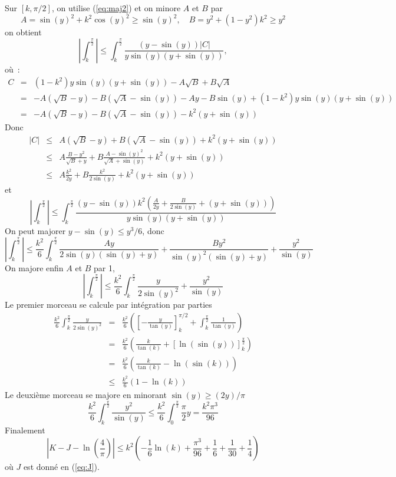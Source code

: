 \documentclass[a4paper,11pt]{article}
\begin{document}
Sur $[k,\pi/2]$, on utilise (\ref{eq:maj2})
et on minore $A$ et $B$ par
\[ A=\sin(y)^2+k^2 \cos(y)^2 \geq \sin(y)^2, \quad B=y^2+(1-y^2)k^2 \geq y^2\]
on obtient
\[ 
| \int_k^{\frac{\pi}{2}} | \leq  \int_k^{\frac{\pi}{2}}
\frac{(y-\sin(y))|C|}
{y \sin(y) (y+\sin(y))} , 
\]
où~:
\begin{eqnarray*}
C&=&(1-k^2)y \sin(y)(y+\sin(y))-A\sqrt{B}+B\sqrt{A} \\
&=& -A(\sqrt{B}-y)-B(\sqrt{A}-\sin(y))
-Ay-B\sin(y) + (1-k^2)y \sin(y)(y+\sin(y)) \\
&=& -A(\sqrt{B}-y)-B(\sqrt{A}-\sin(y)) - k^2(y+\sin(y))
\end{eqnarray*}
Donc
\begin{eqnarray*}
 |C| &\leq& A(\sqrt{B}-y)+B(\sqrt{A}-\sin(y)) + k^2(y+\sin(y)) \\
&\leq& A \frac{B-y^2}{\sqrt{B}+y}
+ B \frac{A-\sin(y)^2}{\sqrt{A}+\sin(y)} + k^2(y+\sin(y)) \\
&\leq & A \frac{k^2}{2y} + B \frac{k^2}{2\sin(y)} + k^2(y+\sin(y))
\end{eqnarray*}
et
\[ 
| \int_k^{\frac{\pi}{2}} | \leq 
\int_k^{\frac{\pi}{2} }
\frac{(y-\sin(y))k^2(\frac{A}{2y} + \frac{B}{2\sin(y)} + (y+\sin(y))) }
{y \sin(y) (y+\sin(y))}
\]
On peut majorer $y-\sin(y) \leq y^3/6$, donc
\[ 
| \int_k^{\frac{\pi}{2}} | \leq 
\frac{k^2}{6} \int_k^{\frac{\pi}{2}}
 \frac{Ay}{2\sin(y) (\sin(y)+y)} + \frac{By^2}{\sin(y)^2(\sin(y)+y)} + \frac{y^2}{\sin(y)}
\]
On majore enfin $A$ et $B$ par 1, 
\[ | \int_k^{\frac{\pi}{2}} |
\leq \frac{k^2}{6} \int_k^{\frac{\pi}{2}}
\frac{y}{2\sin(y)^2} + \frac{y^2}{\sin(y)}
\]
Le premier morceau se calcule par intégration par parties
\begin{eqnarray*}
\frac{k^2}{6} \int_k^{\frac{\pi}{2}}
\frac{y}{2\sin(y)^2}
&=&
\frac{k^2}{6} \left( [-\frac{y}{\tan(y)}]_k^{\pi/2} 
+ \int_k^{\frac{\pi}{2}} \frac{1}{\tan(y)}
\right) \\
&=& \frac{k^2}{6} \left(\frac{k}{\tan(k)}+ [\ln(\sin(y))]_k^{\frac{\pi}{2}} \right)\\
&=& \frac{k^2}{6} \left(\frac{k}{\tan(k)}-\ln(\sin(k)) \right)\\
&\leq &  \frac{k^2}{6}(1-\ln(k))
\end{eqnarray*}
Le deuxième morceau se majore en minorant $\sin(y)\geq (2y)/\pi$
\[ 
\frac{k^2}{6} \int_k^{\frac{\pi}{2}} \frac{y^2}{\sin(y)}
\leq \frac{k^2}{6} \int_0^{\frac{\pi}{2}} \frac{\pi}{2} y
= \frac{k^2\pi^3}{96} 
\]
Finalement
\[ |K-J-\ln(\frac{4}{\pi})| 
\leq k^2 \left( -\frac{1}{6} \ln(k) + \frac{\pi^3}{96} + \frac{1}{6} + \frac{1}{30}+ 
\frac{1}{4} \right)
\]
où $J$ est donné en (\ref{eq:J}).
\end{document}
